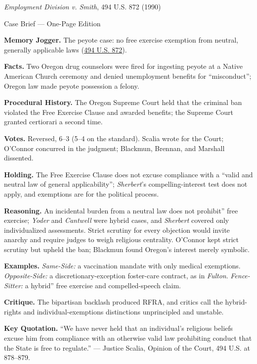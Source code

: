 \documentclass[12pt]{article}
\begin{document}
\begin{center}
{\Large \textit{Employment Division v. Smith}, 494 U.S. 872 (1990)\par}
\vspace{0.3em}
{\normalsize Case Brief --- One-Page Edition\par}
\end{center}

\textbf{Memory Jogger.} The peyote case: no free exercise exemption from neutral, generally applicable laws (\href{https://supreme.justia.com/cases/federal/us/494/872/}{494 U.S. 872}).

\textbf{Facts.} Two Oregon drug counselors were fired for ingesting peyote at a Native American Church ceremony and denied unemployment benefits for ``misconduct''; Oregon law made peyote possession a felony.

\textbf{Procedural History.} The Oregon Supreme Court held that the criminal ban violated the Free Exercise Clause and awarded benefits; the Supreme Court granted certiorari a second time.

\textbf{Votes.} Reversed, 6--3 (5--4 on the standard). Scalia wrote for the Court; O'Connor concurred in the judgment; Blackmun, Brennan, and Marshall dissented.

\textbf{Holding.} The Free Exercise Clause does not excuse compliance with a ``valid and neutral law of general applicability''; \textit{Sherbert}'s compelling-interest test does not apply, and exemptions are for the political process.

\textbf{Reasoning.} An incidental burden from a neutral law does not prohibit'' free exercise; \textit{Yoder} and \textit{Cantwell} were hybrid cases, and \textit{Sherbert} covered only individualized assessments. Strict scrutiny for every objection would invite anarchy and require judges to weigh religious centrality. O'Connor kept strict scrutiny but upheld the ban; Blackmun found Oregon's interest merely symbolic.

\textbf{Examples.} \emph{Same-Side:} a vaccination mandate with only medical exemptions. \emph{Opposite-Side:} a discretionary-exception foster-care contract, as in \textit{Fulton}. \emph{Fence-Sitter:} a hybrid'' free exercise and compelled-speech claim.

\textbf{Critique.} The bipartisan backlash produced RFRA, and critics call the hybrid-rights and individual-exemptions distinctions unprincipled and unstable.

\textbf{Key Quotation.} ``We have never held that an individual's religious beliefs excuse him from compliance with an otherwise valid law prohibiting conduct that the State is free to regulate.'' --- Justice Scalia, Opinion of the Court, 494 U.S. at 878--879.
\end{document}
